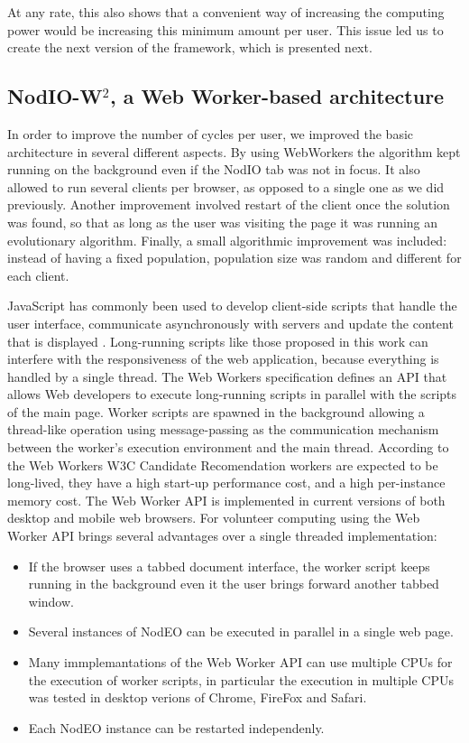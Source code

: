 \documentclass[journal,onecolumn]{IEEEtran}
\begin{document}
At any rate, this also shows that a convenient way of increasing the
computing power would be increasing this minimum amount per user. This
issue led us to create the next version of the framework, which is
presented next. 

\subsection{{\sf NodIO-W$^2$}, a Web Worker-based architecture}

In order to improve the number of cycles per user, we improved the
basic architecture in several different aspects. By using WebWorkers
the algorithm kept running on the background even if the {\sf NodIO}
tab was not in focus. It also allowed to run several clients per
browser, as opposed to a single one as we did previously. Another
improvement involved restart of the client once the solution was
found, so that as long as the user was visiting the page it was
running an evolutionary algorithm. Finally, a small algorithmic
improvement was included: instead of having a fixed population,
population size was random and different for each client. 

JavaScript has commonly been used to develop client-side scripts
that handle the user interface, communicate asynchronously with servers and 
update the content that is displayed \cite{flanagan2006javascript}.
Long-running scripts like those proposed in this work can interfere with the
responsiveness of the web application, because everything is handled by a 
single thread. The Web Workers specification \cite{hickson2012web} defines an 
API that allows Web developers to execute long-running scripts in parallel
with the scripts of the main page. Worker scripts are spawned in the 
background allowing a thread-like operation using message-passing as the 
communication mechanism between the worker's execution environment and the 
main thread. According to the Web Workers W3C Candidate Recomendation 
\cite{hickson2012web} workers are expected to be long-lived, they have a high 
start-up performance cost, and a high per-instance memory cost. The Web Worker
API is implemented in current versions of both desktop and mobile web browsers.
For volunteer computing using the Web Worker API brings several advantages 
over a single threaded implementation:

\begin{itemize}
\item If the browser uses a tabbed document interface, the worker script 
keeps running in the background even it the user brings forward another tabbed
window.
\item Several instances of NodEO can be executed in parallel in a single web
page. 
\item Many immplemantations of the Web Worker API can use multiple CPUs for
the execution of worker scripts, in particular the execution in multiple CPUs
was tested in desktop verions of Chrome, FireFox and Safari.
\item Each NodEO instance can be restarted independenly.
\end{itemize}
\end{document}
